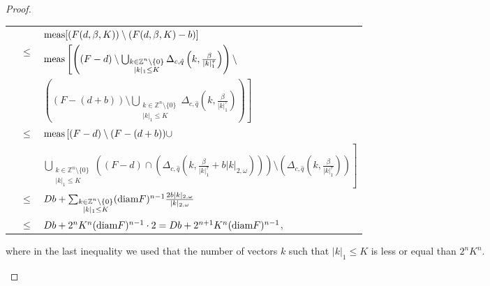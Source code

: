 \begin{proof}
\begin{enumerate}
\begin{longtable}{rcl}
& & $\textnormal{meas}[(F(d,\beta,K))\setminus(F(d,\beta,K)-b)]$ \\
& $\leq$ & $ \textnormal{meas}
\left[\left((F-d)\setminus\bigcup_{\substack{k\in\mathbb{Z}^n\setminus\{0\} \\ |k|_1 \leq K}}\Delta_{c,\hat q} \left(k,\frac{\beta}{|k|_1^\tau}\right)\right)\setminus
\right.$\\
& & \qquad $ \left.
\left((F-(d+b))\setminus\bigcup_{\substack{k\in\mathbb{Z}^n\setminus\{0\} \\ |k|_1 \leq K}}\Delta_{c,\hat q} \left(k,\frac{\beta}{|k|_1^\tau}\right)\right)\right]$ \\
& $\leq$ & $ \textnormal{meas}\left[(F-d)\setminus(F-(d+b))\cup \right.
$\\
& & \qquad $ \left.
\bigcup_{\substack{k\in\mathbb{Z}^n\setminus\{0\} \\ |k|_1 \leq K}}\left((F-d)\cap\left(\Delta_{c,\hat q} \left(k,\frac{\beta}{|k|_1^\tau}+ b|k|_{2,\omega}\right)\right)\right)\setminus\left(\Delta_{c,\hat q} \left(k,\frac{\beta}{|k|_1^\tau}\right)\right)\right]$  \\
& $\leq$ & $ Db + \sum_{\substack{k\in\mathbb{Z}^n\setminus\{0\} \\ |k|_1 \leq K}} (\textnormal{diam} F)^{n-1}\frac{2b|k|_{2,\omega}}{|k|_{2,\omega}}$  \\
& $\leq$ & $ Db + 2^n K^n(\textnormal{diam} F)^{n-1}\cdot 2 = Db + 2^{n+1}K^n(\textnormal{diam} F)^{n-1}$,  \\
\end{longtable}


where in the last inequality we used that the number of vectors $k$ such that $|k|_1\leq K$ is less or equal than $2^n K^n$.

\end{enumerate}


\end{proof}
